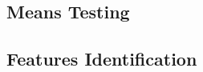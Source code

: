 \subsection{Means Testing}
\label{subsec:smartMeansTesting}

\subsection{Features Identification}
\label{subsec:smartFeaturesIdentification}
